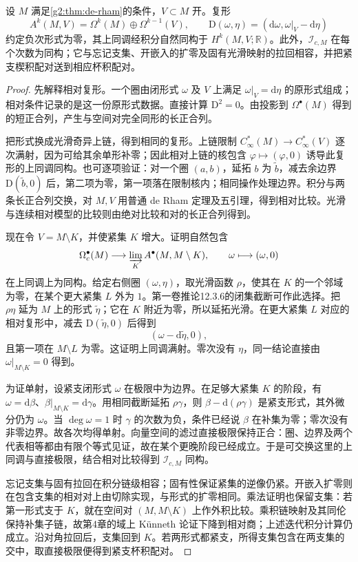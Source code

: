 \begin{theorem}\label{g2:thm:de-rham-support}
	设 \(M\) 满足\cref{g2:thm:de-rham}的条件，\(V\subset M\) 开。复形
	\[
		A^k(M,V)=\Omega^k(M)\oplus\Omega^{k-1}(V),\qquad
		\mathrm D(\omega,\eta)=(\mathrm d\omega,\omega|_V-\mathrm d\eta)
	\]
	约定负次形式为零，其上同调经积分自然同构于 \(H^k(M,V;\mathbb R)\)。此外，\(\mathcal I_{c,M}\) 在每个次数为同构；它与忘记支集、开嵌入的扩零及固有光滑映射的拉回相容，并把紧支楔积配对送到相应杯积配对。
\end{theorem}
\begin{proof}
	先解释相对复形。一个圈由闭形式 \(\omega\) 及 \(V\) 上满足 \(\omega|_V=\mathrm d\eta\) 的原形式组成；相对条件记录的是这一份原形式数据。直接计算 \(\mathrm D^2=0\)。由投影到 \(\Omega^\bullet(M)\) 得到的短正合列，产生与空间对完全同形的长正合列。

	把形式换成光滑奇异上链，得到相同的复形。上链限制 \(C_\infty^*(M)\to C_\infty^*(V)\) 逐次满射，因为可给其余单形补零；因此相对上链的核包含 \(\varphi\mapsto(\varphi,0)\) 诱导此复形的上同调同构。也可逐项验证：对一个圈 \((a,b)\)，延拓 \(b\) 为 \(\widetilde b\)，减去余边界 \(\mathrm D(\widetilde b,0)\) 后，第二项为零，第一项落在限制核内；相同操作处理边界。积分与两条长正合列交换，对 \(M,V\) 用普通 de Rham 定理及五引理，得到相对比较。光滑与连续相对模型的比较则由绝对比较和对的长正合列得到。

	现在令 \(V=M\setminus K\)，并使紧集 \(K\) 增大。证明自然包含
	\[
		\Omega_c^\bullet(M)\longrightarrow\varinjlim_K A^\bullet(M,M\setminus K),
		\qquad\omega\longmapsto(\omega,0)
	\]
	在上同调上为同构。给定右侧圈 \((\omega,\eta)\)，取光滑函数 \(\rho\)，使其在 \(K\) 的一个邻域为零，在某个更大紧集 \(L\) 外为 \(1\)。第一卷推论12.3.6的闭集截断可作此选择。把 \(\rho\eta\) 延为 \(M\) 上的形式 \(\widetilde\eta\)；它在 \(K\) 附近为零，所以延拓光滑。在更大紧集 \(L\) 对应的相对复形中，减去 \(\mathrm D(\widetilde\eta,0)\) 后得到
	\[
		(\omega-\mathrm d\widetilde\eta,0),
	\]
	且第一项在 \(M\setminus L\) 为零。这证明上同调满射。零次没有 \(\eta\)，同一结论直接由 \(\omega|_{M\setminus K}=0\) 得到。

	为证单射，设紧支闭形式 \(\omega\) 在极限中为边界。在足够大紧集 \(K\) 的阶段，有 \(\omega=\mathrm d\beta\)、\(\beta|_{M\setminus K}=\mathrm d\gamma\)。用相同截断延拓 \(\rho\gamma\)，则 \(\beta-\mathrm d(\rho\gamma)\) 是紧支形式，其外微分仍为 \(\omega\)。当 \(\deg\omega=1\) 时 \(\gamma\) 的次数为负，条件已经说 \(\beta\) 在补集为零；零次没有非零边界。故各次均得单射。向量空间的滤过直接极限保持正合：圈、边界及两个代表相等都由有限个等式见证，故在某个更晚阶段已经成立。于是可交换这里的上同调与直接极限，结合相对比较得到 \(\mathcal I_{c,M}\) 同构。

	忘记支集与固有拉回在积分链级相容；固有性保证紧集的逆像仍紧。开嵌入扩零则在包含支集的相对对上由切除实现，与形式的扩零相同。乘法证明也保留支集：若第一形式支于 \(K\)，就在空间对 \((M,M\setminus K)\) 上作外积比较。乘积链映射及其同伦保持补集子链，故第4章的域上 Künneth 论证下降到相对商；上述迭代积分计算仍成立。沿对角拉回后，支集回到 \(K\)。若两形式都紧支，所得支集包含在两支集的交中，取直接极限便得到紧支杯积配对。
\end{proof}

